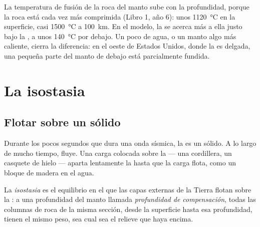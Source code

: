 La temperatura de fusión de la roca del manto sube con la profundidad, porque
la roca está cada vez más comprimida (Libro 1, año 6): unos
\qty{1120}{\celsius} en la superficie, casi \qty{1500}{\celsius} a
\qty{100}{km}. En el modelo, la  se acerca más a ella justo bajo la
, a unos \qty{140}{\celsius} por debajo. Un poco de agua, o un manto
algo más caliente, cierra la diferencia: en el oeste de Estados Unidos, donde
la  es delgada, una pequeña parte del manto de debajo está
parcialmente fundida.

\section{La isostasia}

\subsection{Flotar sobre un sólido}

Durante los pocos segundos que dura una onda sísmica, la  es un
sólido. A lo largo de mucho tiempo, fluye. Una carga colocada sobre la
 --- una cordillera, un casquete de hielo --- aparta lentamente la
 hasta que la carga flota, como un bloque de madera en el agua.

\begin{definition}\label{def:g11:lithosphere-asthenosphere:isostasy}
La \emph{isostasia} es el equilibrio en el que las capas
externas de la Tierra flotan sobre la : a una profundidad del manto
llamada \emph{profundidad de compensación},
todas las columnas de roca de la misma sección, desde la superficie hasta esa
profundidad, tienen el mismo peso, sea cual sea el relieve que haya encima.
\end{definition}

